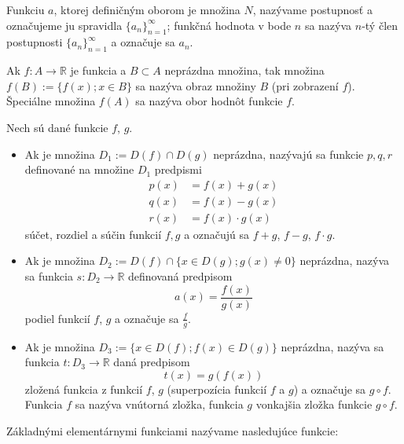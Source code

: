 Funkciu $a$, ktorej definičným oborom je množina $N$, nazývame postupnosť a
označujeme ju spravidla $\{a_n\}_{n=1}^\infty$; funkčná hodnota v bode $n$ sa
nazýva $n$-tý člen postupnosti $\{a_n\}_{n=1}^\infty$ a označuje sa $a_n$.

Ak $f:A \rightarrow \mathbb{R}$ je funkcia a $B \subset A$ neprázdna množina,
tak množina $f(B):=\{f(x);x\in B \}$ sa nazýva obraz množiny $B$ (pri zobrazení
$f$). Špeciálne množina $f(A)$ sa nazýva obor hodnôt funkcie $f$.

Nech sú dané funkcie $f$, $g$.

\begin{itemize}
\item
  Ak je množina $D_1:=D(f)\cap D(g)$ neprázdna, nazývajú sa funkcie $p, q, r$
  definované na množine $D_1$ predpismi
  \begin{align*}
    p(x) &= f(x)+g(x) \\
    q(x) &= f(x)-g(x) \\
    r(x) &= f(x)\cdot g(x)
  \end{align*}
  súčet, rozdiel a súčin funkcií $f, g$ a označujú sa $f+g$, $f-g$, $f\cdot g$.
\item
  Ak je množina $D_2:=D(f)\cap \{x\in D(g);g(x)\neq 0\}$ neprázdna, nazýva sa
  funkcia $s:D_2 \rightarrow \mathbb{R}$ definovaná predpisom
  $$a(x)=\frac{f(x)}{g(x)}$$
  podiel funkcií $f$, $g$ a označuje sa $\frac{f}{g}$.
\item
  Ak je množina $D_3:=\{x\in D(f);f(x)\in D(g)\}$ neprázdna, nazýva sa funkcia
  $t:D_3\rightarrow\mathbb{R}$ daná predpisom
  $$t(x)=g(f(x))$$
  zložená funkcia z funkcií $f$, $g$ (superpozícia funkcií $f$ a $g$) a označuje
  sa $g \circ f$. Funkcia $f$ sa nazýva vnútorná zložka, funkcia $g$ vonkajšia
  zložka funkcie $g \circ f$.
\end{itemize}

Základnými elementárnymi funkciami nazývame nasledujúce funkcie:


